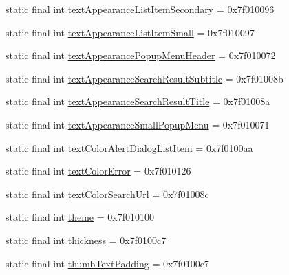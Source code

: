 \begin{CompactItemize}
\item 
static final int \hyperlink{classandroid_1_1support_1_1graphics_1_1drawable_1_1animated_1_1_r_1_1attr_d86a71a1f863da3b7a2cd1ac24e19c9b}{textAppearanceListItemSecondary} = 0x7f010096
\item 
static final int \hyperlink{classandroid_1_1support_1_1graphics_1_1drawable_1_1animated_1_1_r_1_1attr_c6316e0dca330f02be70cb9c86e65976}{textAppearanceListItemSmall} = 0x7f010097
\item 
static final int \hyperlink{classandroid_1_1support_1_1graphics_1_1drawable_1_1animated_1_1_r_1_1attr_88bd262e484fffe9233f1088d6a750e6}{textAppearancePopupMenuHeader} = 0x7f010072
\item 
static final int \hyperlink{classandroid_1_1support_1_1graphics_1_1drawable_1_1animated_1_1_r_1_1attr_638709139b0e837e1b9ab591c1ef544d}{textAppearanceSearchResultSubtitle} = 0x7f01008b
\item 
static final int \hyperlink{classandroid_1_1support_1_1graphics_1_1drawable_1_1animated_1_1_r_1_1attr_c5318dd96096b3475af7db46ec8adacd}{textAppearanceSearchResultTitle} = 0x7f01008a
\item 
static final int \hyperlink{classandroid_1_1support_1_1graphics_1_1drawable_1_1animated_1_1_r_1_1attr_8ed7b1945616b7b0df3791cfecd8d68d}{textAppearanceSmallPopupMenu} = 0x7f010071
\item 
static final int \hyperlink{classandroid_1_1support_1_1graphics_1_1drawable_1_1animated_1_1_r_1_1attr_6bcf4b82ed87d9a153e62c3755c024ad}{textColorAlertDialogListItem} = 0x7f0100aa
\item 
static final int \hyperlink{classandroid_1_1support_1_1graphics_1_1drawable_1_1animated_1_1_r_1_1attr_41653d580a0c20506dc14cf8cd4253cf}{textColorError} = 0x7f010126
\item 
static final int \hyperlink{classandroid_1_1support_1_1graphics_1_1drawable_1_1animated_1_1_r_1_1attr_752976725cb94182da532cdd9979cdd0}{textColorSearchUrl} = 0x7f01008c
\item 
static final int \hyperlink{classandroid_1_1support_1_1graphics_1_1drawable_1_1animated_1_1_r_1_1attr_abe544c17f1668a55ab3a571ca2e5c59}{theme} = 0x7f010100
\item 
static final int \hyperlink{classandroid_1_1support_1_1graphics_1_1drawable_1_1animated_1_1_r_1_1attr_41d3ec09a6918d2afa666a70b5d12f0e}{thickness} = 0x7f0100c7
\item 
static final int \hyperlink{classandroid_1_1support_1_1graphics_1_1drawable_1_1animated_1_1_r_1_1attr_677cfea7a5cff8a3110b0f00010f9da3}{thumbTextPadding} = 0x7f0100e7

\end{CompactItemize}
